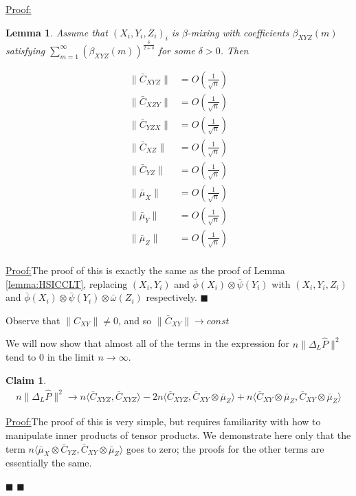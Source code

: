 \documentclass[12pt]{article}
\newtheorem{claim}{Claim}
\newtheorem{lemma}{Lemma}
\newenvironment{claimproof}[1]{\par\noindent\underline{Proof:}\space#1}{\hfill $\blacksquare$}
\numberwithin{claim}{section}
\numberwithin{lemma}{section}
\numberwithin{theorem}{section}
\begin{document}
\begin{claimproof}
\begin{lemma}
Assume that $(X_i,Y_i,Z_i)_i$ is $\beta$-mixing with coefficients $\beta_{XYZ}(m)$ satisfying $\sum_{m=1}^\infty (\beta_{XYZ}(m))^{\frac{\delta}{2+\delta}}$ for some $\delta > 0$. Then

\begin{align*}
\|\bar{C}_{XYZ}\| & = O(\frac{1}{\sqrt{n}})\\
\|\bar{C}_{XZY}\| & = O(\frac{1}{\sqrt{n}})\\
\|\bar{C}_{YZX}\| & = O(\frac{1}{\sqrt{n}})\\
\|\bar{C}_{XZ}\| & = O(\frac{1}{\sqrt{n}})\\
\|\bar{C}_{YZ}\| & = O(\frac{1}{\sqrt{n}})\\
\|\bar{\mu}_X\| & = O(\frac{1}{\sqrt{n}})\\
\|\bar{\mu}_Y\| & = O(\frac{1}{\sqrt{n}})\\
\|\bar{\mu}_Z\| & = O(\frac{1}{\sqrt{n}})\\
\end{align*}

\end{lemma}

\begin{claimproof}
The proof of this is exactly the same as the proof of Lemma \ref{lemma:HSICCLT}, replacing $(X_i,Y_i)$ and $\bar{\phi}(X_i)\otimes\bar{\psi}(Y_i)$ with $(X_i,Y_i,Z_i)$ and $\bar{\phi}(X_i)\otimes\bar{\psi}(Y_i)\otimes\bar{\omega}(Z_i)$ respectively.
\end{claimproof}

Observe that $\|C_{XY}\| \neq 0$, and so $\| \bar{C}_{XY}\| \longrightarrow const$ 

We will now show that almost all of the terms in the expression for $n\|\Delta_L \hat{P}\|^2$ tend to 0 in the limit $n \longrightarrow \infty$.

\begin{claim}\label{claim:LancasterAsymptote1}
\begin{align*}
n\|\Delta_L \hat{P}\|^2 \longrightarrow n\langle \bar{C}_{XYZ},\bar{C}_{XYZ} \rangle - 2n\langle \bar{C}_{XYZ},\bar{C}_{XY}\otimes\bar{\mu}_Z \rangle + n\langle \bar{C}_{XY}\otimes\bar{\mu}_Z,\bar{C}_{XY}\otimes\bar{\mu}_Z \rangle 
\end{align*}
\end{claim}

\begin{claimproof}
The proof of this is very simple, but requires familiarity with how to manipulate inner products of tensor products. We demonstrate here only that the term $n\langle \bar{\mu}_X\otimes\bar{C}_{YZ},\bar{C}_{XY}\otimes\bar{\mu}_Z \rangle$ goes to zero; the proofs for the other terms are essentially the same.


\end{claimproof}
\end{claimproof}
\end{document}
